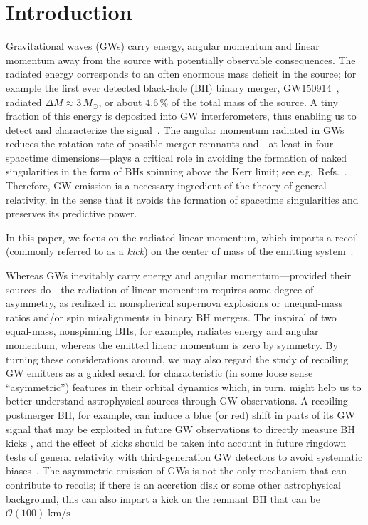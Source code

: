 \documentclass[floats,floatfix,showpacs,amssymb,physrev,twocolumn,superscriptaddress,reprint,
nofootinbib, longbibliography]{revtex4-2}
\newcounter{count}
\begin{document}
\section{Introduction}

Gravitational waves (GWs) carry energy, angular momentum and linear
momentum away from the source with potentially observable
consequences. The radiated energy corresponds to an often enormous
mass deficit in the source; for example the first ever detected
black-hole (BH) binary merger, GW150914~\cite{Abbott:2016blz}, radiated
$\Delta M\approx 3\,M_{\odot}$, or about $4.6\,\%$ of the total mass
of the source. A tiny fraction of this energy is deposited into GW
interferometers, thus enabling us to detect and characterize the
signal~\cite{Saulson:2010zz}. The angular momentum radiated in GWs
reduces the rotation rate of possible merger remnants and---at least
in four spacetime dimensions---plays a critical role in avoiding the
formation of naked singularities in the form of BHs spinning above the
Kerr limit; see
e.g.~Refs.~\cite{Campanelli:2006uy,Sperhake:2009jz}. Therefore, GW emission
is a necessary ingredient of the theory of general relativity, in the
sense that it avoids the formation of spacetime singularities and
preserves its predictive power.

In this paper, we focus on the radiated linear momentum, which
imparts a recoil (commonly referred to as a \emph{kick}) on the center
of mass of the emitting
system~\cite{Bonnor1961-wy,Peres:1962zz,Bekenstein:1973zz}.

Whereas GWs inevitably carry energy and angular momentum---provided
their sources do---the radiation of linear momentum requires some
degree of asymmetry, as realized in nonspherical supernova explosions
or unequal-mass ratios and/or spin misalignments in binary BH
mergers. The inspiral of two equal-mass, nonspinning BHs, for example,
radiates energy and angular momentum, whereas the emitted linear
momentum is zero by symmetry. By turning these considerations around,
we may also regard the study of recoiling GW emitters as a guided
search for characteristic (in some loose sense ``asymmetric'')
features in their orbital dynamics which, in turn, might help us to
better understand astrophysical sources through GW observations.
A recoiling postmerger BH, for example, can induce a blue (or
red) shift in parts of its GW signal that may be exploited in future
GW observations to directly measure BH kicks
\cite{Gerosa:2016vip,CalderonBustillo:2018zuq,Lousto:2019lyf}, and
the effect of kicks should be taken into account in future ringdown
tests of general relativity with third-generation GW detectors to
avoid systematic biases~\cite{Varma:2020nbm}.
The asymmetric emission of GWs is not the only mechanism that 
can contribute to recoils; if there is an accretion disk or some other
astrophysical background, this can also impart a kick on the remnant
BH that can be $\mathcal{O}(100)\;\mathrm{km/s}$ \cite{Cardoso:2020lxx}.
\end{document}
